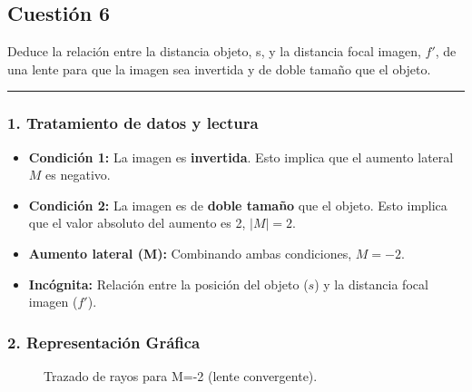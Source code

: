 \newpage
\subsection{Cuestión 6}
\label{subsec:C6_2021_jul_ext}

\begin{cajaenunciado}
Deduce la relación entre la distancia objeto, s, y la distancia focal imagen, $f'$, de una lente para que la imagen sea invertida y de doble tamaño que el objeto.
\end{cajaenunciado}
\hrule

\subsubsection*{1. Tratamiento de datos y lectura}
\begin{itemize}
    \item \textbf{Condición 1:} La imagen es \textbf{invertida}. Esto implica que el aumento lateral $M$ es negativo.
    \item \textbf{Condición 2:} La imagen es de \textbf{doble tamaño} que el objeto. Esto implica que el valor absoluto del aumento es 2, $|M|=2$.
    \item \textbf{Aumento lateral (M):} Combinando ambas condiciones, $M = -2$.
    \item \textbf{Incógnita:} Relación entre la posición del objeto ($s$) y la distancia focal imagen ($f'$).
\end{itemize}

\subsubsection*{2. Representación Gráfica}
\begin{figure}[H]
    \centering
    \caption{Trazado de rayos para M=-2 (lente convergente).}
\end{figure}

